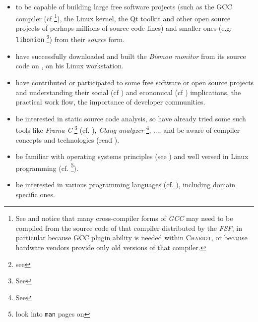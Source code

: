 \begin{itemize}
\item to be capable of building large free software projects (such as
  the GCC compiler (cf \cite{gcc-internals} \footnote{See
     and notice that many cross-compiler
    forms of \emph{GCC} may need to be compiled from the source code
    of that compiler distributed by the \emph{FSF}, in particular
    because GCC plugin ability is needed within \textsc{Chariot}, or
    because hardware vendors provide only old versions of that
    compiler.}), the Linux kernel, the Qt toolkit and other open
  source projects of perhaps millions of source code lines) and
  smaller ones (e.g. \texttt{libonion} \footnote{see
    }) from their \emph{source}
  form.

\item have successfully downloaded and built the \emph{Bismon
  monitor}  from its source code on
  , on his Linux workstation.
  
\item have contributed or participated to some free software or open
  source projects and understanding their social (cf
  \cite{Raymond:2001:CathBaz}) and economical (cf
  \cite{Weber:2004:SuccessOpenSource, Tirole:2016:EcoBienCommun,
    Nagle:2018:Contributing}) implications, the practical work flow,
  the importance of developer communities.
  
\item be interested in static source code analysis, so have already
  tried some such tools like \emph{Frama-C} \footnote{See
    } (cf. \cite{Cuoq:2012:Frama-C}),
  \emph{Clang analyzer} \footnote{See
    }, ..., and be aware of
   compiler concepts and technologies (read
  \cite{Aho:2006:DragonBook}).

\item be familiar with operating systems principles
  (see \cite{Tanenbaum:92:OS,ArpaciDusseau14-Book}) and well
  versed in Linux programming
  (cf. \cite{Mitchell:2001:ALP,Kerrisk:2010:LinuxProgramming} \footnote{look
    into \texttt{man} pages on
    }).

  \item be interested in various programming languages
    (cf. \cite{Abelson1996:SICP,Scott:2007:PLP,Queinnec:1996:LSP}),
    including domain specific ones.

\end{itemize}



